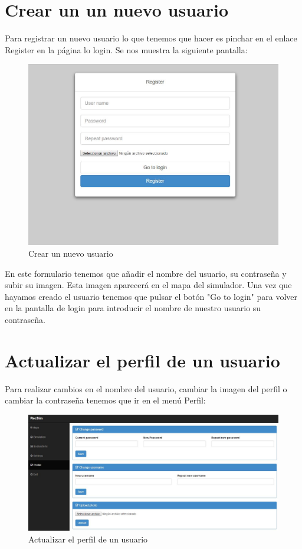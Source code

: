 \section{Crear un un nuevo usuario}\label{sec:CrearUsuario}

Para registrar un nuevo usuario lo que tenemos que hacer es pinchar en el enlace Register en la página lo login. Se nos muestra la siguiente pantalla:

\begin{figure}[H]
	\centering\includegraphics[scale=0.25]{imagenes/capitulo5/register.jpg}
	\caption{Crear un nuevo usuario}
	\label{img:AddUser}
\end{figure}

En este formulario tenemos que añadir el nombre del usuario, su contraseña y subir su imagen. Esta imagen aparecerá en el mapa del simulador. Una vez que hayamos creado el usuario tenemos que pulsar el botón "Go to login" para volver en la pantalla de login para introducir el nombre de nuestro usuario su contraseña.

\section{Actualizar el perfil de un usuario}

Para realizar cambios en el nombre del usuario, cambiar la imagen del perfil o cambiar la contraseña tenemos que ir en el menú Perfil:

\begin{figure}[H]
	\centering\includegraphics[scale=0.35]{imagenes/capitulo6/perfil-del-usuario.jpg}
	\caption{Actualizar el perfil de un usuario}
	\label{img:UpdateUser}
\end{figure}

